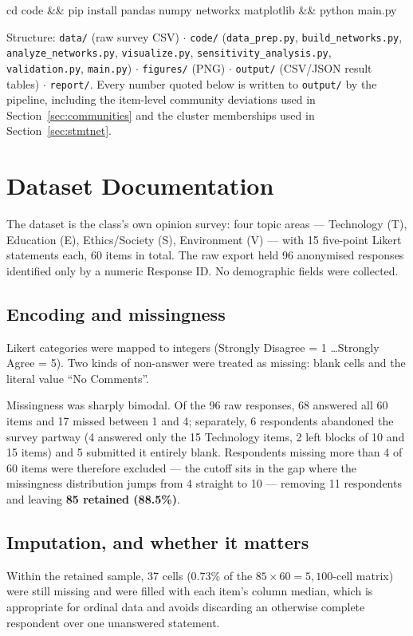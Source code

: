 \documentclass[11pt,a4paper]{article}
\begin{document}
\begin{center}\small\ttfamily
cd code \&\& pip install pandas numpy networkx matplotlib \&\& python main.py
\end{center}

\noindent Structure: \texttt{data/} (raw survey CSV) $\cdot$ \texttt{code/} (\texttt{data\_prep.py}, \texttt{build\_networks.py}, \texttt{analyze\_networks.py}, \texttt{visualize.py}, \texttt{sensitivity\_analysis.py}, \texttt{validation.py}, \texttt{main.py}) $\cdot$ \texttt{figures/} (PNG) $\cdot$ \texttt{output/} (CSV/JSON result tables) $\cdot$ \texttt{report/}. Every number quoted below is written to \texttt{output/} by the pipeline, including the item-level community deviations used in Section~\ref{sec:communities} and the cluster memberships used in Section~\ref{sec:stmtnet}.

\section{Dataset Documentation}
The dataset is the class's own opinion survey: four topic areas --- Technology (T), Education (E), Ethics/Society (S), Environment (V) --- with 15 five-point Likert statements each, 60 items in total. The raw export held 96 anonymised responses identified only by a numeric Response ID. No demographic fields were collected.

\subsection{Encoding and missingness}
Likert categories were mapped to integers (Strongly Disagree = 1 \dots Strongly Agree = 5). Two kinds of non-answer were treated as missing: blank cells and the literal value ``No Comments''.

Missingness was sharply bimodal. Of the 96 raw responses, 68 answered all 60 items and 17 missed between 1 and 4; separately, 6 respondents abandoned the survey partway (4 answered only the 15 Technology items, 2 left blocks of 10 and 15 items) and 5 submitted it entirely blank. Respondents missing more than 4 of 60 items were therefore excluded --- the cutoff sits in the gap where the missingness distribution jumps from 4 straight to 10 --- removing 11 respondents and leaving \textbf{85 retained (88.5\%)}.

\subsection{Imputation, and whether it matters}\label{sec:imputation}
Within the retained sample, 37 cells (0.73\% of the $85 \times 60 = 5{,}100$-cell matrix) were still missing and were filled with each item's column median, which is appropriate for ordinal data and avoids discarding an otherwise complete respondent over one unanswered statement.
\end{document}
